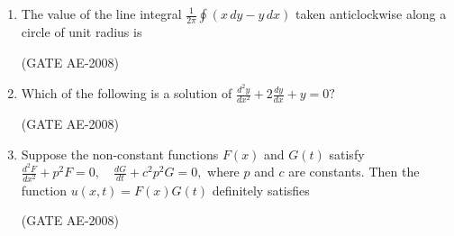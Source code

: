 \documentclass[journal,12pt,onecolumn]{IEEEtran}
\theoremstyle{remark}
\begin{document}
\begin{enumerate}
\quad

    \item  The value of the line integral
    $
    \frac{1}{2\pi} \oint (x\,dy - y\,dx)
    $
    taken anticlockwise along a circle of unit radius is
    \begin{enumerate}
    \end{enumerate}
\hfill(GATE AE-2008)

\quad

    \item Which of the following is a solution of 
    $
    \frac{d^2 y}{dx^2} + 2\frac{dy}{dx} + y = 0 ?
    $
    \begin{enumerate}
    \end{enumerate}
    \hfill(GATE AE-2008)

    \quad

    \item Suppose the non-constant functions $F(x)$ and $G(t)$ satisfy
    $
    \frac{d^2 F}{dx^2} + p^2 F = 0,\quad \frac{dG}{dt} + c^2 p^2 G = 0,
    $
    where $p$ and $c$ are constants. Then the function $u(x,t) = F(x)G(t)$ definitely satisfies
    \begin{enumerate}
    \end{enumerate}
    \hfill(GATE AE-2008)


\end{enumerate}
\end{document}
